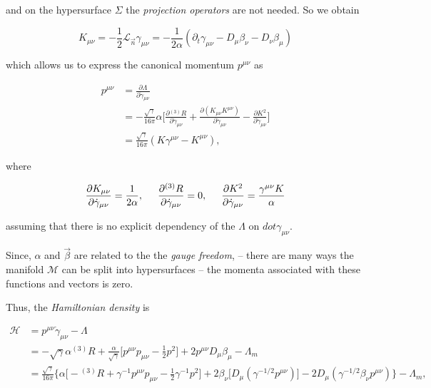 {    and on the hypersurface $\Sigma$ the \textit{projection operators} are not needed. So we obtain
    
    \begin{equation}
    K_{\mu\nu} = -\frac{1}{2}\mathcal{L}_{\vec{n}}\gamma_{\mu\nu}=-\frac{1}{2\alpha}(\partial_t\gamma_{\mu\nu}-D_{\mu}\beta_{\nu}-D_{\nu}\beta_{\mu})
    \end{equation}
    
    which allows us to express the canonical momentum $p^{\mu\nu}$ as
    
    \begin{align}
    p^{\mu\nu} &= \frac{\partial\Lambda}{\partial\dot{\gamma}_{\mu\nu}} \\
    &= -\frac{\sqrt{\gamma}}{16\pi}\alpha\Bigg[\frac{\partial {^{(3)}R}}{\partial\dot{\gamma}_{\mu\nu}} + \frac{\partial(K_{\mu\nu}K^{\mu\nu})}{\partial\dot{\gamma}_{\mu\nu}} - \frac{\partial K^2}{\partial\dot{\gamma}_{\mu\nu}}\Bigg] \\
    &= \frac{\sqrt{\gamma}}{16\pi}(K\gamma^{\mu\nu} - K^{\mu\nu}),
    \end{align}
    
    where 
    
    \begin{equation}
    \frac{\partial K_{\mu\nu}}{\partial \dot{\gamma}_{\mu\nu}} = \frac{1}{2\alpha}, \hspace{5mm} \frac{\partial {^{(3)}R}}{\partial \dot{\gamma}_{\mu\nu}} = 0, \hspace{5mm}\frac{\partial K^2}{\partial \dot{\gamma}_{\mu\nu}} = \frac{\gamma^{\mu\nu}K}{\alpha}
    \end{equation}
    
    assuming that there is no explicit dependency of the $\Lambda$ on $dot{\gamma}_{\mu\nu}$.
    
    Since, $\alpha$ and $\vec{\beta}$ are related to the the \textit{gauge freedom}, -- there are many ways the manifold $\mathcal{M}$ can be split into hypersurfaces -- the momenta associated with these functions and vectors is zero.
    
    Thus, the \textit{Hamiltonian density} is
    
    \begin{align}
    \mathcal{H} &= p^{\mu\nu}\dot{\gamma}_{\mu\nu} - \Lambda \\
    &= -\sqrt{\gamma}\alpha{^{(3)}R} + \frac{\alpha}{\sqrt{\gamma}}\Big[p^{\mu\nu}p_{\mu\nu}-\frac{1}{2}p^2\Big] + 2p^{\mu\nu} D_{\mu}\beta_{\mu} -\Lambda_m \\
    &= \frac{\sqrt{\gamma}}{16\pi}\Bigg\{\alpha\Big[ -{^{(3)}R} + \gamma^{-1}p^{\mu\nu}p_{\mu\nu}-\frac{1}{2}\gamma^{-1}p^2\Big] +  2\beta_{\nu}\Big[D_{\mu}(\gamma^{-1/2}p^{\mu\nu})\Big] - 2D_{\mu}(\gamma^{-1/2}\beta_{\nu}p^{\mu\nu}) \Bigg\} - \Lambda_m,
    \end{align}
    
}
